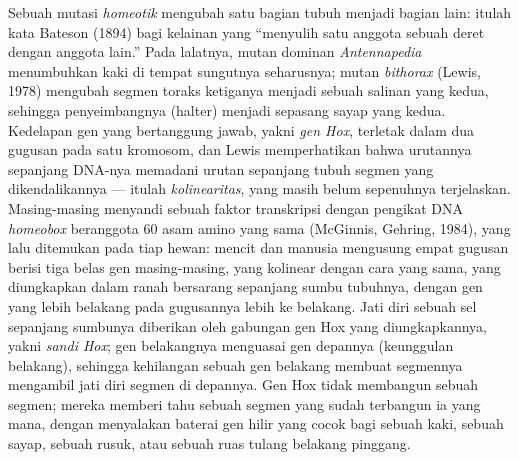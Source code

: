 \begin{definition}\label{def:b3:developmental-genetics:hox}
%
Sebuah mutasi \emph{homeotik} mengubah satu bagian tubuh menjadi bagian lain:
itulah kata Bateson (1894) bagi kelainan yang ``menyulih satu
anggota sebuah deret dengan anggota lain.'' Pada lalatnya, mutan dominan
\emph{Antennapedia} menumbuhkan kaki di tempat sungutnya seharusnya; mutan
\emph{bithorax} (Lewis, 1978) mengubah segmen toraks ketiganya menjadi sebuah salinan
yang kedua, sehingga penyeimbangnya (halter) menjadi sepasang sayap yang
kedua. Kedelapan gen yang bertanggung jawab, yakni \emph{gen Hox}, terletak dalam dua
gugusan pada satu kromosom, dan Lewis memperhatikan bahwa urutannya sepanjang
DNA-nya memadani urutan sepanjang tubuh segmen yang dikendalikannya
--- itulah \emph{kolinearitas}, yang masih belum sepenuhnya terjelaskan. Masing-masing menyandi sebuah
faktor transkripsi dengan  pengikat DNA \emph{homeobox} beranggota
60 asam amino yang sama (McGinnis, Gehring, 1984), yang lalu ditemukan
pada tiap hewan: mencit dan manusia mengusung empat gugusan berisi tiga belas gen
masing-masing, yang kolinear dengan cara yang sama, yang diungkapkan dalam ranah bersarang sepanjang
sumbu tubuhnya, dengan gen yang lebih belakang pada gugusannya lebih ke belakang. Jati diri sebuah sel
sepanjang sumbunya diberikan oleh gabungan gen Hox yang
diungkapkannya, yakni \emph{sandi Hox}; gen belakangnya menguasai gen depannya
(keunggulan belakang), sehingga kehilangan sebuah gen belakang membuat segmennya
mengambil jati diri segmen di depannya. Gen Hox tidak membangun sebuah
segmen; mereka memberi tahu sebuah segmen yang sudah terbangun ia yang mana, dengan
menyalakan baterai gen hilir yang cocok bagi sebuah kaki, sebuah
sayap, sebuah rusuk, atau sebuah ruas tulang belakang pinggang.
\end{definition}

